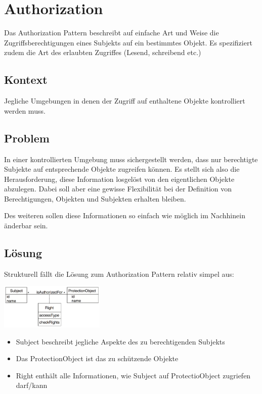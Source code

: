 \section{Authorization}

Das Authorization Pattern beschreibt auf einfache Art und Weise die Zugriffsberechtigungen eines Subjekts auf ein bestimmtes Objekt. Es spezifiziert zudem die Art des erlaubten Zugriffes (Lesend, schreibend etc.)

\subsection*{Kontext}
Jegliche Umgebungen in denen der Zugriff auf enthaltene Objekte kontrolliert werden muss.

\subsection*{Problem}
In einer kontrollierten Umgebung muss sichergestellt werden, dass nur berechtigte Subjekte auf entsprechende Objekte zugreifen können. Es stellt sich also die Herausforderung, diese Information losgelöst von den eigentlichen Objekte abzulegen. Dabei soll aber eine gewisse Flexibilität bei der Definition von Berechtigungen, Objekten und Subjekten erhalten bleiben.

Des weiteren sollen diese Informationen so einfach wie möglich im Nachhinein änderbar sein.

\subsection*{Lösung}
Strukturell fällt die Lösung zum Authorization Pattern relativ simpel aus:

\includegraphics[width=50mm]{chapter/01accesscontrolmodels/authorization.png}

\begin{itemize}
	\item Subject beschreibt jegliche Aspekte des zu berechtigenden Subjekts
	\item Das ProtectionObject ist das zu schützende Objekte
	\item Right enthält alle Informationen, wie Subject auf ProtectioObject zugriefen darf/kann
\end{itemize}

